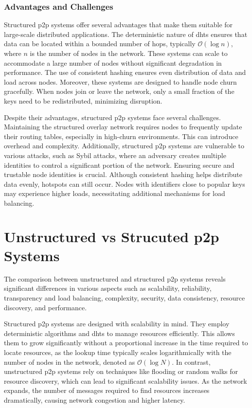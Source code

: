 \subsubsection*{Advantages and Challenges}
Structured \gls{p2p} systems offer several advantages that make them suitable for large-scale distributed applications.
The deterministic nature of \glspl{dht} ensures that data can be located within a bounded number of hops, typically $\mathcal{O}(\log n)$, where $n$ is the number of nodes in the network.
These systems can scale to accommodate a large number of nodes without significant degradation in performance.
The use of consistent hashing ensures even distribution of data and load across nodes.
Moreover, these systems are designed to handle node churn gracefully.
When nodes join or leave the network, only a small fraction of the keys need to be redistributed, minimizing disruption.

Despite their advantages, structured \gls{p2p} systems face several challenges.
Maintaining the structured overlay network requires nodes to frequently update their routing tables, especially in high-churn environments.
This can introduce overhead and complexity.
Additionally, structured \gls{p2p} systems are vulnerable to various attacks, such as Sybil attacks, where an adversary creates multiple identities to control a significant portion of the network.
Ensuring secure and trustable node identities is crucial.
Although consistent hashing helps distribute data evenly, hotspots can still occur.
Nodes with identifiers close to popular keys may experience higher loads, necessitating additional mechanisms for load balancing.

\section{Unstructured vs Strucuted \gls{p2p} Systems}
The comparison between unstructured and structured \gls{p2p} systems reveals significant differences in various aspects such as scalability, reliability, transparency and load balancing, complexity, security, data consistency, resource discovery, and performance.

Structured \gls{p2p} systems are designed with scalability in mind.
They employ deterministic algorithms and \glspl{dht} to manage resources efficiently.
This allows them to grow significantly without a proportional increase in the time required to locate resources, as the lookup time typically scales logarithmically with the number of nodes in the network, denoted as \(\mathcal{O}(\log N)\).
In contrast, unstructured \gls{p2p} systems rely on techniques like flooding or random walks for resource discovery, which can lead to significant scalability issues.
As the network expands, the number of messages required to find resources increases dramatically, causing network congestion and higher latency.


